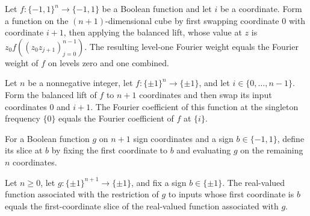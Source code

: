 \begin{theorem}
\label{FABL.fourierWeightAtLevel_one_improvedFKNBalancedLift}
\leanok
{}
Let $f:\{-1,1\}^n\to\{-1,1\}$ be a Boolean function and let $i$ be a coordinate. Form a
function on the $(n+1)$-dimensional cube by first swapping coordinate $0$ with
coordinate $i+1$, then applying the balanced lift, whose value at $z$ is $z_0
f((z_0z_{j+1})_{j=0}^{n-1})$. The resulting level-one Fourier weight equals the Fourier
weight of $f$ on levels zero and one combined.
\end{theorem}

\begin{theorem}
\label{FABL.fourierCoeff_improvedFKNBalancedLift_zero}
\leanok
{}
Let $n$ be a nonnegative integer, let $f:\{\pm1\}^n\to\{\pm1\}$, and let
$i\in\{0,\ldots,n-1\}$. Form the balanced lift of $f$ to $n+1$ coordinates and then swap
its input coordinates $0$ and $i+1$. The Fourier coefficient of this function at the
singleton frequency $\{0\}$ equals the Fourier coefficient of $f$ at $\{i\}$.
\end{theorem}

\begin{definition}
\label{FABL.improvedFKNSlice}
\leanok
{}
For a Boolean function $g$ on $n+1$ sign coordinates and a sign $b\in\{-1,1\}$, define
its slice at $b$ by fixing the first coordinate to $b$ and evaluating $g$ on the
remaining $n$ coordinates.
\end{definition}

\begin{theorem}
\label{FABL.improvedFKNSlice_toReal}
\leanok
{}
Let $n\ge0$, let $g\colon\{\pm1\}^{n+1}\to\{\pm1\}$, and fix a sign $b\in\{\pm1\}$. The
real-valued function associated with the restriction of $g$ to inputs whose first
coordinate is $b$ equals the first-coordinate slice of the real-valued function
associated with $g$.
\end{theorem}

